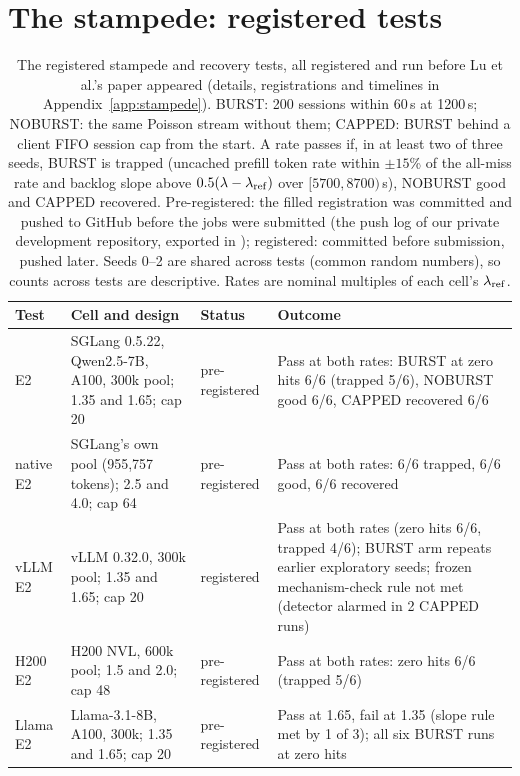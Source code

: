 \section{The stampede: registered tests}\label{sec:stampede}

\begin{table}[t]
\centering\footnotesize
\caption{The registered stampede and recovery tests, all registered and run before Lu et al.'s paper appeared (details,
registrations and timelines in Appendix~\ref{app:stampede}). BURST: 200 sessions within 60\,s at 1200\,s; NOBURST: the same
Poisson stream without them; CAPPED: BURST behind a client FIFO session cap from the start. A rate passes if, in at least two of
three seeds, BURST is trapped (uncached prefill token rate within $\pm15$\% of the all-miss rate and backlog slope above $0.5(\lambda-\lambda_{\mathrm{ref}})$
over $[5700,8700)$\,s), NOBURST good and CAPPED recovered. Pre-registered: the filled registration was committed and pushed to GitHub
before the jobs were submitted (the push log of our private development repository, exported in ); registered:
committed before submission, pushed later. Seeds 0--2 are shared across tests (common random numbers), so counts across tests are
descriptive. Rates are nominal multiples of each cell's $\lambda_{\mathrm{ref}}$.}\label{tab:stampede}
\setlength{\tabcolsep}{3pt}
\begin{tabular}{@{}>{\raggedright\arraybackslash}p{2.4cm} >{\raggedright\arraybackslash}p{5.3cm} >{\raggedright\arraybackslash}p{1.9cm} >{\raggedright\arraybackslash}p{7.5cm}@{}}
\toprule
Test & Cell and design & Status & Outcome\\
\midrule
E2 & SGLang 0.5.22, Qwen2.5-7B, A100, 300k pool; 1.35 and 1.65; cap 20 & pre-registered & Pass at both rates: BURST at zero hits 6/6 (trapped 5/6), NOBURST good 6/6, CAPPED recovered 6/6\\
native E2 & SGLang's own pool (955,757 tokens); 2.5 and 4.0; cap 64 & pre-registered & Pass at both rates: 6/6 trapped, 6/6 good, 6/6 recovered\\
vLLM E2 & vLLM 0.32.0, 300k pool; 1.35 and 1.65; cap 20 & registered & Pass at both rates (zero hits 6/6, trapped 4/6); BURST arm repeats earlier exploratory seeds; frozen mechanism-check rule not met (detector alarmed in 2 CAPPED runs)\\
H200 E2 & H200 NVL, 600k pool; 1.5 and 2.0; cap 48 & pre-registered & Pass at both rates: zero hits 6/6 (trapped 5/6)\\
Llama E2 & Llama-3.1-8B, A100, 300k; 1.35 and 1.65; cap 20 & pre-registered & Pass at 1.65, fail at 1.35 (slope rule met by 1 of 3); all six BURST runs at zero hits\\

\end{tabular}
\end{table}
